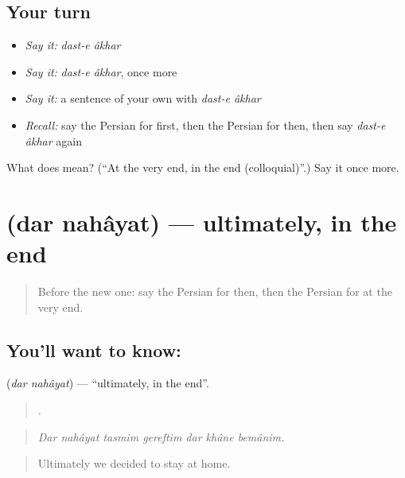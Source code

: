 \subsection*{Your turn}
\begin{itemize}
\raggedright
  \item \emph{Say it:} \emph{dast-e âkhar}
  \item \emph{Say it:} \emph{dast-e âkhar}, once more
  \item \emph{Say it:} a sentence of your own with \emph{dast-e âkhar}
  \item \emph{Recall:} say the Persian for first, then the Persian for then, then say \emph{dast-e âkhar} again
\end{itemize}

\begin{tcolorbox}[breakable,colback=teal!4,colframe=teal!35!black,title={Before you move on}]
What does   mean? (\textquotedblleft{}At the very end, in the end (colloquial)\textquotedblright{}.) Say it once more.
\end{tcolorbox}
\section[\texorpdfstring{\fa{در} \fa{نهایت} (dar nahâyat)}{در نهایت (dar nahâyat)}]{  (dar nahâyat) — ultimately, in the end}

\label{lesson:FA-C303-dar-nahayat}



\begin{quote}
Before the new one: say the Persian for then, then the Persian for at the very end.
\end{quote}

\subsection*{You'll want to know:  }
\textbf{ } (\emph{dar nahâyat}) — \textquotedblleft{}ultimately, in the end\textquotedblright{}.

\begin{quote}
      .
\end{quote}

\begin{quote}
\emph{Dar nahâyat tasmim gereftim dar khâne bemânim.}
\end{quote}

\begin{quote}
Ultimately we decided to stay at home.
\end{quote}

